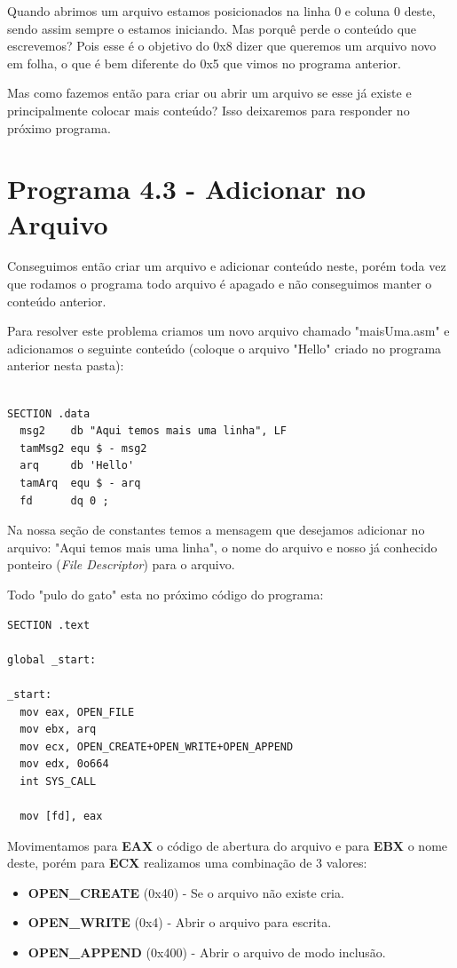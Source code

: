 Quando abrimos um arquivo estamos posicionados na linha 0 e coluna 0 deste, sendo assim sempre o estamos iniciando. Mas porquê perde o conteúdo que escrevemos? Pois esse é o objetivo do 0x8 dizer que queremos um arquivo novo em folha, o que é bem diferente do 0x5 que vimos no programa anterior.

Mas como fazemos então para criar ou abrir um arquivo se esse já existe e principalmente colocar mais conteúdo? Isso deixaremos para responder no próximo programa.

\section{Programa 4.3 - Adicionar no Arquivo}
Conseguimos então criar um arquivo e adicionar conteúdo neste, porém toda vez que rodamos o programa todo arquivo é apagado e não conseguimos manter o conteúdo anterior.

Para resolver este problema criamos um novo arquivo chamado "maisUma.asm" e adicionamos o seguinte conteúdo (coloque o arquivo "Hello" criado no programa anterior nesta pasta):
\begin{lstlisting}[]
%include 'bibliotecaE.inc'

SECTION .data
  msg2    db "Aqui temos mais uma linha", LF
  tamMsg2 equ $ - msg2
  arq     db 'Hello'
  tamArq  equ $ - arq
  fd      dq 0 ;
\end{lstlisting}

Na nossa seção de constantes temos a mensagem que desejamos adicionar no arquivo: "Aqui temos mais uma linha", o nome do arquivo e nosso já conhecido ponteiro (\textit{File Descriptor}) para o arquivo.

Todo "pulo do gato" esta no próximo código do programa:
\begin{lstlisting}[]
SECTION .text

global _start:

_start:
  mov eax, OPEN_FILE
  mov ebx, arq
  mov ecx, OPEN_CREATE+OPEN_WRITE+OPEN_APPEND
  mov edx, 0o664
  int SYS_CALL
  
  mov [fd], eax	
\end{lstlisting}	

Movimentamos para \textbf{EAX} o código de abertura do arquivo e para \textbf{EBX} o nome deste, porém para \textbf{ECX} realizamos uma combinação de 3 valores:
\begin{itemize}[nolistsep]
	\item \textbf{OPEN\_CREATE} (0x40) - Se o arquivo não existe cria.
	\item \textbf{OPEN\_WRITE} (0x4) - Abrir o arquivo para escrita.
	\item \textbf{OPEN\_APPEND} (0x400) - Abrir o arquivo de modo inclusão.
\end{itemize}	

